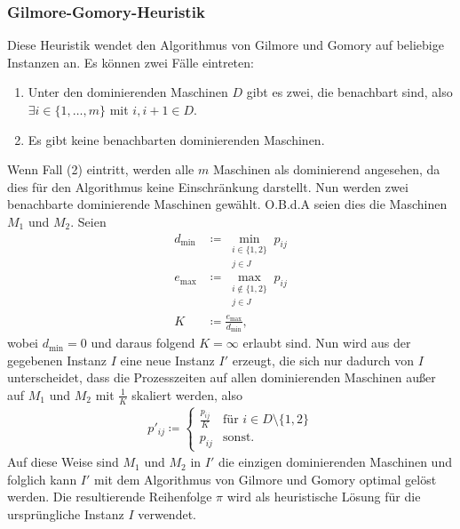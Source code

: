 \documentclass{scrreprt}
\begin{document}
\subsubsection{Gilmore-Gomory-Heuristik}
\label{subsubsec:ggHeuristik}
Diese Heuristik wendet den Algorithmus von Gilmore und Gomory auf beliebige Instanzen an.
Es können zwei Fälle eintreten:
\begin{enumerate}
    \item Unter den dominierenden Maschinen $D$ gibt es zwei, die benachbart sind, also $\exists i\in\{1,\ldots,m\}$ mit $i,i+1\in D$.
    \item Es gibt keine benachbarten dominierenden Maschinen.
\end{enumerate}
Wenn Fall (2) eintritt, werden alle $m$ Maschinen als dominierend angesehen, da dies für den Algorithmus keine Einschränkung darstellt.
Nun werden zwei benachbarte dominierende Maschinen gewählt.
O.B.d.A seien dies die Maschinen $M_1$ und $M_2$. Seien 
\begin{align} 
    d_{\min} &\coloneqq \min_{\substack{i\in \{1,2\} \\ j\in J}} p_{ij} \\
    e_{\max} &\coloneqq \max_{\substack{i\not\in \{1,2\} \\ j\in J}} p_{ij} \\
    K &\coloneqq \frac{e_{\max}}{d_{\min}} \text{,}
\end{align}
wobei $d_{\min}=0$ und daraus folgend $K=\infty$ erlaubt sind. 
Nun wird aus der gegebenen Instanz $I$ eine neue Instanz $I'$ erzeugt, die sich nur dadurch von $I$ unterscheidet, dass die Prozesszeiten
auf allen dominierenden Maschinen außer auf $M_1$ und $M_2$ mit $\frac{1}{K}$ skaliert werden, also
\begin{align}
    p'_{ij} \coloneqq \begin{cases} \frac{p_{ij}}{K} &\text{für } i\in D\setminus\{1,2\} \\ p_{ij} &\text{sonst.} \end{cases}
\end{align}
Auf diese Weise sind $M_1$ und $M_2$ in $I'$ die einzigen dominierenden Maschinen und folglich kann $I'$ mit dem Algorithmus von Gilmore und Gomory optimal gelöst werden.
Die resultierende Reihenfolge $\pi$ wird als heuristische Lösung für die ursprüngliche Instanz $I$ verwendet.
\end{document}

